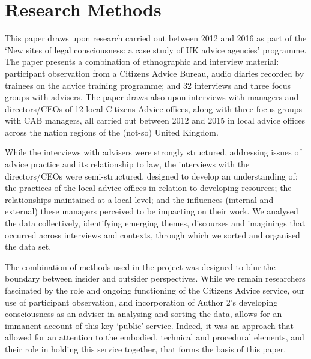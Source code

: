 \chapter{Research Methods}
This paper draws upon research carried out between 2012 and 2016 as part of the ‘New sites of legal consciousness: a case study of UK advice agencies’ programme.%
The paper presents a combination of ethnographic and interview material: participant observation from a Citizens Advice Bureau, audio diaries recorded by trainees on the advice training programme; and 32 interviews and three focus groups with advisers. The paper draws also upon interviews with managers and directors/CEOs of 12 local Citizens Advice offices, along with three focus groups with CAB managers, all carried out between 2012 and 2015 in local advice offices across the nation regions of the (not-so) United Kingdom.%
\par
While the interviews with advisers were strongly structured, addressing issues of advice practice and its relationship to law, the interviews with the directors/CEOs were semi-structured, designed to develop an understanding of: the practices of the local advice offices in relation to developing resources; the relationships maintained at a local level; and the influences (internal and external) these managers perceived to be impacting on their work.%
We analysed the data collectively, identifying emerging themes, discourses and imaginings that occurred across interviews and contexts, through which we sorted and organised the data set.
\par
The combination of methods used in the project was designed to blur the boundary between insider and outsider perspectives. While we remain researchers fascinated by the role and ongoing functioning of the Citizens Advice service, our use of participant observation, and incorporation of Author 2’s developing consciousness as an adviser in analysing and sorting the data, allows for an immanent account of this key ‘public’ service. Indeed, it was an approach that allowed for an attention to the embodied, technical and procedural elements, and their role in holding this service together, that forms the basis of this paper.
 

